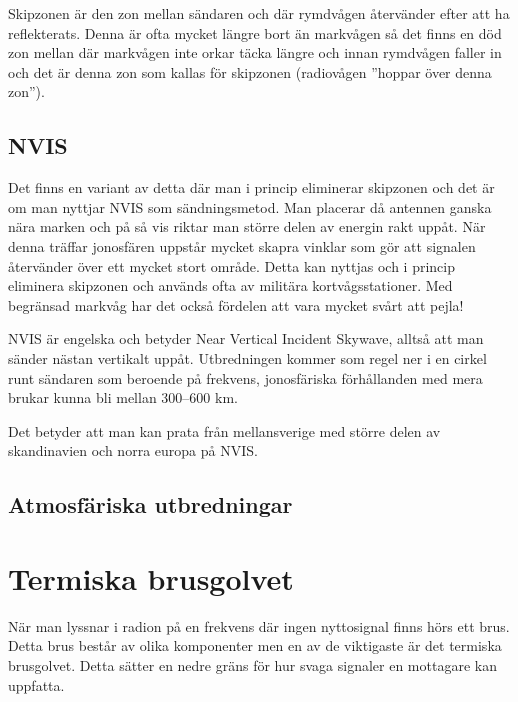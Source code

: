 Skipzonen är den zon mellan sändaren och där rymdvågen återvänder efter att ha
reflekterats. Denna är ofta mycket längre bort än markvågen så det finns en
död zon mellan där markvågen inte orkar täcka längre och innan rymdvågen
faller in och det är denna zon som kallas för skipzonen (radiovågen ''hoppar
över denna zon'').

\subsection{NVIS}

Det finns en variant av detta där man i princip eliminerar skipzonen och det
är om man nyttjar NVIS som sändningsmetod. Man placerar då antennen ganska
nära marken och på så vis riktar man större delen av energin rakt uppåt. När
denna träffar jonosfären uppstår mycket skapra vinklar som gör att signalen
återvänder över ett mycket stort område. Detta kan nyttjas och i princip
eliminera skipzonen och används ofta av militära kortvågsstationer. Med
begränsad markvåg har det också fördelen att vara mycket svårt att pejla!

NVIS är engelska och betyder Near Vertical Incident Skywave, alltså att man
sänder nästan vertikalt uppåt. Utbredningen kommer som regel ner i en cirkel
runt sändaren som beroende på frekvens, jonosfäriska förhållanden med mera
brukar kunna bli mellan 300--600 km.

Det betyder att man kan prata från mellansverige med större delen av
skandinavien och norra europa på NVIS.

\subsection{Atmosfäriska utbredningar}






\section{Termiska brusgolvet}
När man lyssnar i radion på en frekvens där ingen nyttosignal finns hörs ett
brus. Detta brus består av olika komponenter men en av de viktigaste är det
termiska brusgolvet. Detta sätter en nedre gräns för hur svaga signaler en
mottagare kan uppfatta.

